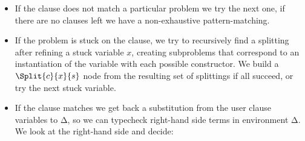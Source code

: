 \begin{itemize}
\item If the clause does not match a particular problem
  we try the next one, if there are no clauses left
  we have a non-exhaustive pattern-matching.

\item If the problem is stuck on the clause, we
  try to recursively find a splitting after refining a stuck variable $x$,
  creating subproblems that correspond to an instantiation of the
  variable with each possible constructor.
  We build a $\Split{c}{x}{s}$ node from the resulting set of
  splittings if all succeed, or try the next stuck variable.

\item If the clause matches we get back a substitution from the user
  clause variables to Δ, so we can typecheck right-hand side terms in
  environment Δ. We look at the right-hand side and decide:


\end{itemize}
